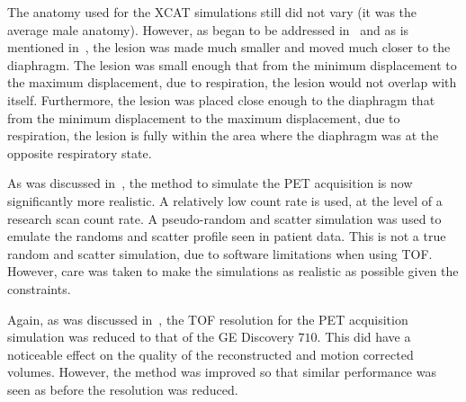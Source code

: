         The anatomy used for the \gls{XCAT} simulations still did not vary (it was the average male anatomy). However, as began to be addressed in~ and as is mentioned in~, the lesion was made much smaller and moved much closer to the diaphragm. The lesion was small enough that from the minimum displacement to the maximum displacement, due to respiration, the lesion would not overlap with itself. Furthermore, the lesion was placed close enough to the diaphragm that from the minimum displacement to the maximum displacement, due to respiration, the lesion is fully within the area where the diaphragm was at the opposite respiratory state.

        As was discussed in~, the method to simulate the \gls{PET} acquisition is now significantly more realistic. A relatively low count rate is used, at the level of a research scan count rate. A pseudo-random and scatter simulation was used to emulate the randoms and scatter profile seen in patient data. This is not a true random and scatter simulation, due to software limitations when using \gls{TOF}. However, care was taken to make the simulations as realistic as possible given the constraints.

        Again, as was discussed in~, the \gls{TOF} resolution for the \gls{PET} acquisition simulation was reduced to that of the \gls{GE} Discovery $710$. This did have a noticeable effect on the quality of the reconstructed and motion corrected volumes. However, the method was improved so that similar performance was seen as before the resolution was reduced.

